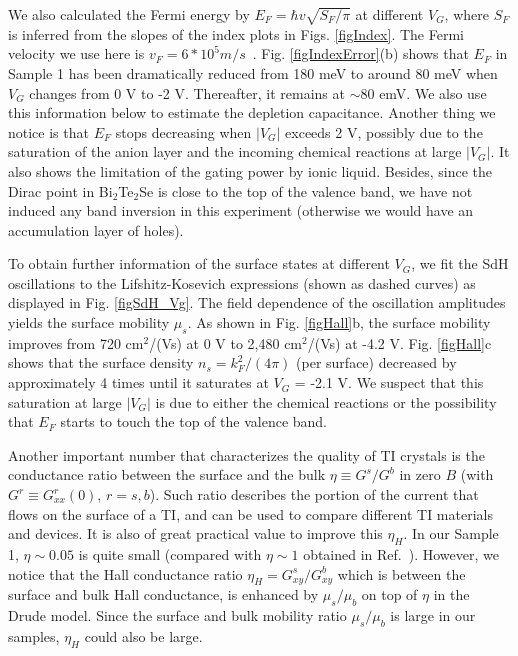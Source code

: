 We also calculated the Fermi energy by $E_F=\hbar v \sqrt{S_F/ \pi}$ at different $V_G$, where $S_F$ is inferred from the slopes of the index plots in Figs. \ref{figIndex}. The Fermi velocity we use here is $v_F = 6 * 10^5 m/s$~\cite{Xiong2012}. Fig. \ref{figIndexError}(b) shows that $E_F$ in Sample 1 has been dramatically reduced from 180 meV to around 80 meV when $V_G$ changes from 0 V to -2 V. Thereafter, it remains at $\sim80$ emV. We also use this information below to estimate the depletion capacitance. Another thing we notice is that $E_F$ stops decreasing when $|V_G|$ exceeds 2 V, possibly due to the saturation of the anion layer and the incoming chemical reactions at large $|V_G|$. It also shows the limitation of the gating power by ionic liquid. Besides, since the Dirac point in Bi$_2$Te$_2$Se is close to the top of the valence band, we have not induced any band inversion in this experiment (otherwise we would have an accumulation layer of holes).

To obtain further information of the surface states at different $V_G$, we fit the SdH oscillations to the Lifshitz-Kosevich expressions (shown as dashed curves) as displayed in Fig. \ref{figSdH_Vg}. The field dependence of the oscillation amplitudes yields the surface mobility $\mu_s$. As shown in Fig. \ref{figHall}b, the surface mobility improves from 720 cm$^2$/(Vs) at 0 V to 2,480 cm$^2$/(Vs) at -4.2 V. Fig. \ref{figHall}c shows that the surface density $n_s = k_F^2/(4\pi)$ (per surface) decreased by approximately 4 times until it saturates at $V_G$ = -2.1 V. We suspect that this saturation at large $|V_G|$ is due to either the chemical reactions or the possibility that $E_F$ starts to touch the top of the valence band.

Another important number that characterizes the quality of TI crystals is the conductance ratio between the surface and the bulk $\eta \equiv G^s/G^b$ in zero $B$ (with $G^r \equiv G^r_{xx}(0)$, $r=s,b$). Such ratio describes the portion of the current that flows on the surface of a TI, and can be used to compare different TI materials and devices. It is also of great practical value to improve this $\eta_H$. In our Sample 1, $\eta\sim 0.05$ is quite small (compared with $\eta\sim 1$ obtained in Ref.~\cite{Xiong2012}). However, we notice that the Hall conductance ratio $\eta_H = G^s_{xy}/G^b_{xy}$ which is between the surface and bulk Hall conductance, is enhanced by $\mu_s/\mu_b$ on top of $\eta$ in the Drude model. Since the surface and bulk mobility ratio $\mu_s/\mu_b$ is large in our samples, $\eta_H$ could also be large. 



